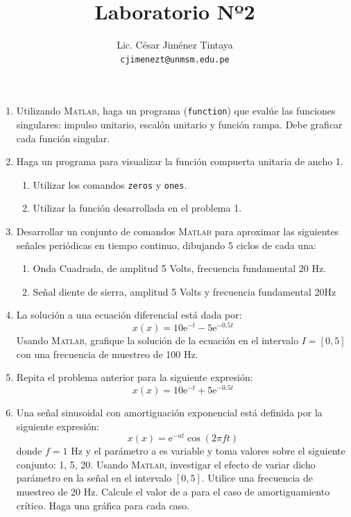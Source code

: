 \documentclass[a4paper,11pt,final]{article}
\begin{document}
    \title{Laboratorio Nº2}
    \author{Lic. César Jiménez Tintaya\\ \small{\texttt{cjimenezt@unmsm.edu.pe}}}
    \date{}
    \maketitle

    \begin{enumerate}
        \item Utilizando \textsc{Matlab}, haga un programa (\texttt{function}) que evalúe las
        funciones singulares: impulso unitario, escalón unitario y función
        rampa. Debe graficar cada función singular.

        \item Haga un programa para visualizar la función compuerta unitaria de ancho 1.
        \begin{enumerate}
            \item Utilizar los comandos \texttt{zeros} y \texttt{ones}.
            \item Utilizar la función desarrollada en el problema 1.
        \end{enumerate}

        \item Desarrollar un conjunto de comandos \textsc{Matlab} para aproximar las
        siguientes señales periódicas en tiempo continuo, dibujando 5 ciclos
        de cada una:
        \begin{enumerate}
            \item Onda Cuadrada, de amplitud 5 Volts, frecuencia fundamental 20 Hz.
            \item Señal diente de sierra, amplitud 5 Volts y frecuencia fundamental 20Hz
        \end{enumerate}

        \item La solución a una ecuación diferencial está dada por:
        $$x\left(x\right) = 10\mathrm{e}^{-t} - 5\mathrm{e}^{-0.5t}$$
        Usando \textsc{Matlab}, grafique la solución de la ecuación en el intervalo
        $I=\left[0,5\right]$ con una frecuencia de muestreo de 100 Hz.

        \item  Repita el problema anterior para la siguiente expresión:
        $$x\left(x\right) = 10\mathrm{e}^{-t} + 5\mathrm{e}^{-0.5t}$$

        \item Una señal sinusoidal con amortiguación exponencial está definida
        por la siguiente expresión:
        $$x\left(x\right) = \mathrm{e}^{-at}\cos\left(2\pi f t\right)$$
        donde $f = 1$ Hz y el parámetro a es variable y toma valores sobre el
        siguiente conjunto: 1, 5, 20. Usando \textsc{Matlab}, investigar el
        efecto de variar dicho parámetro en la señal en el intervalo $[0, 5]$.
        Utilice una frecuencia de muestreo de 20 Hz. Calcule el valor de a
        para el caso de amortiguamiento crítico. Haga una gráfica para cada
        caso.


\end{enumerate}
\end{document}
